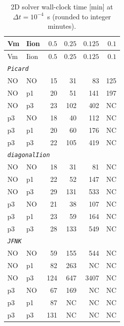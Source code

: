 \documentclass[11pt,a4paper]{article}
\newcommand{\code}[1]{\texttt{\small #1}}
\begin{document}
\begin{center}\footnotesize
\begin{longtable}{llrrrr}
\caption{2D solver wall-clock time [min] at $\Delta t = 10^{-4}$~s
(rounded to integer minutes).}\\
\toprule
Vm & Iion & $0.5$ & $0.25$ & $0.125$ & $0.1$ \\
\midrule\endfirsthead\toprule
Vm & Iion & $0.5$ & $0.25$ & $0.125$ & $0.1$ \\
\midrule\endhead
\multicolumn{6}{l}{\textit{\code{Picard}}}\\
NO & NO &  15 &  31 &  83 & 125 \\
NO & p1 &  20 &  51 & 141 & 197 \\
NO & p3 &  23 & 102 & 402 & NC  \\
p3 & NO &  18 &  40 & 112 & NC  \\
p3 & p1 &  20 &  60 & 176 & NC  \\
p3 & p3 &  22 & 105 & 419 & NC  \\\hline
\multicolumn{6}{l}{\textit{\code{diagonalIion}}}\\
NO & NO &  18 &  31 &  81 & NC  \\
NO & p1 &  22 &  52 & 147 & NC  \\
NO & p3 &  29 & 131 & 533 & NC  \\
p3 & NO &  21 &  38 & 107 & NC  \\
p3 & p1 &  23 &  59 & 164 & NC  \\
p3 & p3 &  28 & 133 & 549 & NC  \\\hline
\multicolumn{6}{l}{\textit{\code{JFNK}}}\\
NO & NO &  59 & 155 & 544 & NC  \\
NO & p1 &  82 & 263 & NC  & NC  \\
NO & p3 & 124 & 647 & 3407 & NC \\
p3 & NO &  67 & 169 & NC  & NC  \\
p3 & p1 &  87 & NC  & NC  & NC  \\
p3 & p3 & 131 & NC  & NC  & NC  \\
\bottomrule\end{longtable}\end{center}
\end{document}
